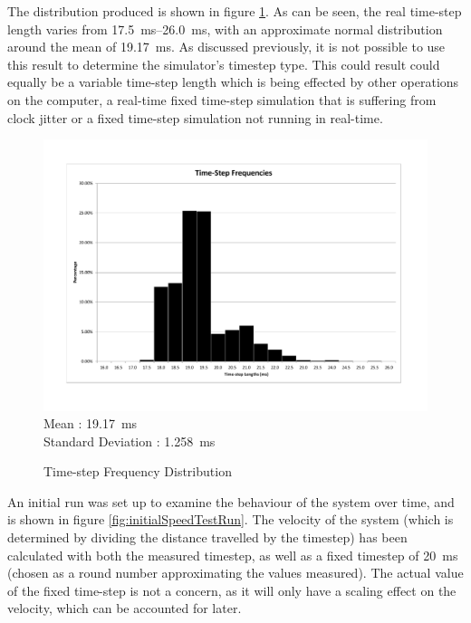 \documentclass[10pt]{article} \usepackage[a4paper]{geometry}
\begin{document}
The distribution produced is shown in figure \ref{fig:timestepDistribution}.  As
 can be seen, the real time-step length varies from
 \SIrange{17.5}{26.0}{\milli\second}, with an approximate normal distribution
 around the mean of \SI{19.17}{\milli\second}.  As discussed previously, it is
 not possible to use this result to determine the simulator's timestep type.
 This could result could equally be a variable time-step length which is being
 effected by other operations on the computer, a real-time fixed time-step
 simulation that is suffering from clock jitter or a fixed time-step simulation
 not running in real-time.

\begin{figure}
 \includegraphics[width=\textwidth]{Images/time-step-length-distribution} \\
 Mean : \SI{19.17}{\milli\second} \\
 Standard Deviation : \SI{1.258}{\milli\second}

 \caption{Time-step Frequency Distribution}
 \label{fig:timestepDistribution}
\end{figure}

An initial run was set up to examine the behaviour of the system over time, and
is shown in figure \ref{fig:initialSpeedTestRun}.  The velocity of the system
(which is determined by dividing the distance travelled by the timestep) has
been calculated with both the measured timestep, as well as a fixed timestep of
\SI{20}{\milli\second} (chosen as a round number approximating the values
measured). The actual value of the fixed time-step is not a concern, as it will
only have a scaling effect on the velocity, which can be accounted for later.
\end{document}
